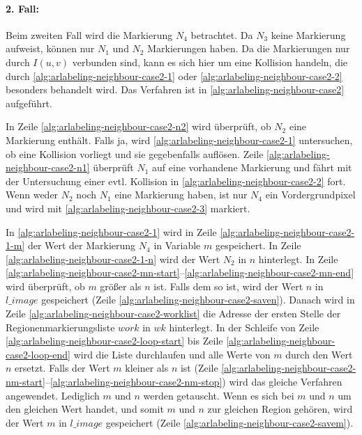 
\paragraph{2. Fall:} %
\label{par:fall_2_}
Beim zweiten Fall wird die Markierung $N_4$ betrachtet. Da $N_3$ keine Markierung aufweist, können nur $N_1$ und $N_2$
 Markierungen haben. Da die Markierungen nur durch $I(u,v)$ verbunden sind, kann es sich hier um eine Kollision
 handeln, die durch \autoref{alg:arlabeling-neighbour-case2-1} oder \autoref{alg:arlabeling-neighbour-case2-2}
 besonders behandelt wird. Das Verfahren ist in \autoref{alg:arlabeling-neighbour-case2} aufgeführt.



In Zeile \ref{alg:arlabeling-neighbour-case2-n2} wird überprüft, ob $N_2$ eine Markierung enthält. Falls ja, wird
 \autoref{alg:arlabeling-neighbour-case2-1} untersuchen, ob eine Kollision vorliegt und sie gegebenfalls auflösen.
 Zeile \ref{alg:arlabeling-neighbour-case2-n1} überprüft $N_1$ auf eine vorhandene Markierung und fährt mit der
 Untersuchung einer evtl. Kollision in \autoref{alg:arlabeling-neighbour-case2-2} fort. Wenn weder $N_2$ noch $N_1$
 eine Markierung haben, ist nur $N_4$ ein Vordergrundpixel und wird mit \autoref{alg:arlabeling-neighbour-case2-3}
 markiert.



In \autoref{alg:arlabeling-neighbour-case2-1} wird in Zeile \ref{alg:arlabeling-neighbour-case2-1-m} der Wert der
 Markierung $N_4$ in Variable $m$ gespeichert. In Zeile \ref{alg:arlabeling-neighbour-case2-1-n} wird der Wert $N_2$
 in $n$ hinterlegt. In Zeile \ref{alg:arlabeling-neighbour-case2-mn-start}--\ref{alg:arlabeling-neighbour-case2-mn-end}
 wird überprüft, ob $m$ größer als $n$ ist. Falls dem so ist, wird der Wert $n$ in $\mathit{l\_image}$ gespeichert
 (Zeile \ref{alg:arlabeling-neighbour-case2-saven}). Danach wird in Zeile \ref{alg:arlabeling-neighbour-case2-worklist}
 die Adresse der ersten Stelle der Regionenmarkierungsliste $\mathit{work}$ in $wk$ hinterlegt. In der Schleife von
 Zeile \ref{alg:arlabeling-neighbour-case2-loop-start} bis Zeile \ref{alg:arlabeling-neighbour-case2-loop-end} wird die
 Liste durchlaufen und alle Werte von $m$ durch den Wert $n$ ersetzt. Falls der Wert $m$ kleiner als $n$ ist
 (Zeile \ref{alg:arlabeling-neighbour-case2-nm-start}--\ref{alg:arlabeling-neighbour-case2-nm-stop}) wird das gleiche
 Verfahren angewendet. Lediglich $m$ und $n$ werden getauscht. Wenn es sich bei $m$ und $n$ um den gleichen Wert
 handet, und somit $m$ und $n$ zur gleichen Region gehören, wird der Wert $m$ in $\mathit{l\_image}$ gespeichert
 (Zeile \ref{alg:arlabeling-neighbour-case2-savem}).

